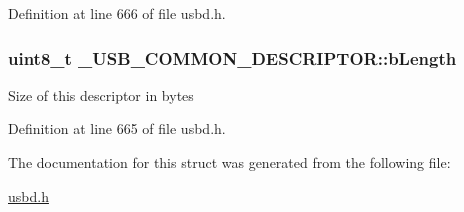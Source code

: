 Definition at line 666 of file usbd.\+h.

\subsubsection[{\texorpdfstring{b\+Length}{bLength}}]{\setlength{\rightskip}{0pt plus 5cm}uint8\+\_\+t \+\_\+\+U\+S\+B\+\_\+\+C\+O\+M\+M\+O\+N\+\_\+\+D\+E\+S\+C\+R\+I\+P\+T\+O\+R\+::b\+Length}\hypertarget{struct__USB__COMMON__DESCRIPTOR_a3b232c5c49b059c8df010496ca69868b}{}\label{struct__USB__COMMON__DESCRIPTOR_a3b232c5c49b059c8df010496ca69868b}
Size of this descriptor in bytes 

Definition at line 665 of file usbd.\+h.



The documentation for this struct was generated from the following file\+:\begin{DoxyCompactItemize}
\item 
\hyperlink{usbd_8h}{usbd.\+h}\end{DoxyCompactItemize}
